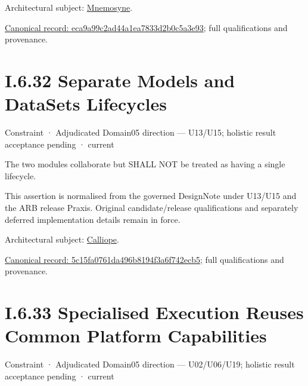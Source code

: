 Architectural subject: \hyperref[element:7985e647bf9e4ca3ba70faf9e3e4ae02]{Mnemosyne}.


{\footnotesize \href{../../../../continuum/motivation/constraint/eca9a99c2ad44a1ea7833d2b0c5a3e93.md}{Canonical record: eca9a99c2ad44a1ea7833d2b0c5a3e93}; full qualifications and provenance.}\par
\section*{I.6.32 Separate Models and DataSets Lifecycles}
\label{navigation:I.6.32}

\label{element:5c15fa0761da496b8194f3a6f742ecb5}
{\small Constraint · Adjudicated Domain05 direction — U13/U15; holistic result acceptance pending · current}\par

The two modules collaborate but SHALL NOT be treated as having a single
lifecycle.



This assertion is normalised from the governed DesignNote under U13/U15 and the ARB release Praxis. Original candidate/release qualifications and separately deferred implementation details remain in force.



Architectural subject: \hyperref[element:466ad8f75a954c0581b5bba090443849]{Calliope}.


{\footnotesize \href{../../../../continuum/motivation/constraint/5c15fa0761da496b8194f3a6f742ecb5.md}{Canonical record: 5c15fa0761da496b8194f3a6f742ecb5}; full qualifications and provenance.}\par
\section*{I.6.33 Specialised Execution Reuses Common Platform Capabilities}
\label{navigation:I.6.33}

\label{element:968e208d336c48b781a4eabd76e6337b}
{\small Constraint · Adjudicated Domain05 direction — U02/U06/U19; holistic result acceptance pending · current}\par

